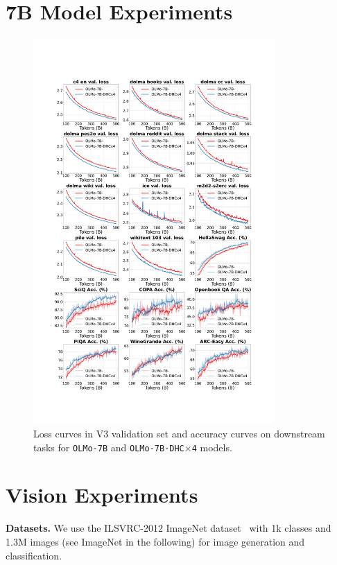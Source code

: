 \section{7B Model Experiments}
\begin{figure}[h]
    \begin{center}
    \includegraphics[width=0.82\textwidth]{fig/7B_v3_downstream.pdf}
    \end{center}
  \caption{Loss curves in V3 validation set and accuracy curves on downstream tasks for \texttt{OLMo-7B} and \texttt{OLMo-7B-DHC$\times$4} models.}
    \label{fig:7b_full_results}
\end{figure}

\newpage
\section{Vision Experiments}
\label{sec:vision_exp}
\textbf{Datasets.} We use the ILSVRC-2012 ImageNet dataset~\citep{deng2009imagenet} with 1k classes and 1.3M images (see ImageNet in the following) for image generation and classification. 
